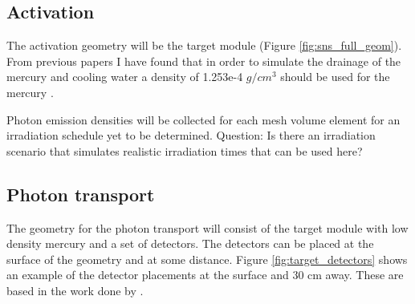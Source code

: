 \subsection{Activation}
The activation geometry will be the target module
(Figure \ref{fig:sns_full_geom}).
From previous papers I have found
that in order to simulate the drainage of the mercury and cooling water
a density of 1.253e-4 $g/cm^{3}$ should be used
for the mercury \cite{SNS2018}.

Photon emission densities will be collected for each mesh
volume element for an irradiation schedule yet to be determined. 
Question: Is there
an irradiation scenario that simulates realistic irradiation times
that can be used here?

\subsection{Photon transport}
The geometry for the photon transport  will consist of the target module
with low density mercury
and a set of detectors. The detectors can be placed at the surface
of the geometry and at some distance. Figure \ref{fig:target_detectors} shows an example
of the detector placements at the surface and 30 cm away. These are based
in the work done by \cite{SNS2018}.

